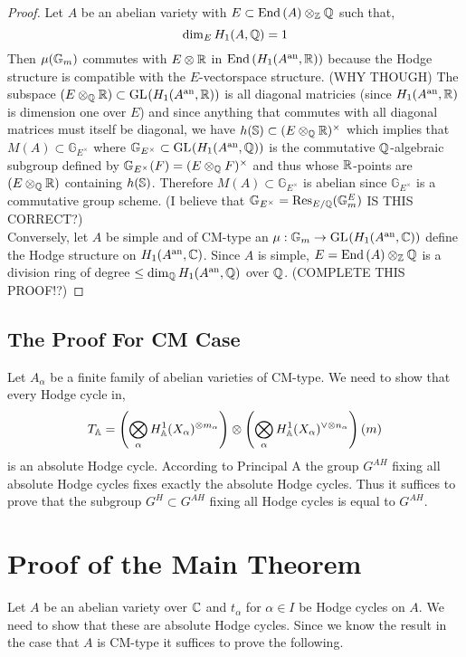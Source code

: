 \documentclass[12pt]{article}
\begin{document}
\begin{proof}
Let $A$ be an abelian variety with $E \subset \End{A} \otimes_\Z \Q$ such that, 
\[ \dim_{E} H_1(A, \Q) = 1 \]
Then $\mu(\Gm)$ commutes with $E \otimes \R$ in $\End{H_1(A^\an, \R)}$ because the Hodge structure is compatible with the $E$-vectorspace structure. (WHY THOUGH)
The subspace $(E \otimes_\Q \R) \subset \GL{}{H_1(A^\an, \R)}$ is all diagonal matricies (since $H_1(A^\an, \R)$ is dimension one over $E$) and since anything that commutes with all diagonal matrices must itself be diagonal, we have $h(\S) \subset (E \otimes_\Q \R)^\times$ which implies that $M(A) \subset \mathbb{G}_{E^\times}$ where $\mathbb{G}_{E^\times} \subset \GL{}{H_1(A^\an, \Q)}$ is the commutative $\Q$-algebraic subgroup defined by $\mathbb{G}_{E^\times}(F) = (E \otimes_\Q F)^\times$ and thus whose $\R$-points are $(E \otimes_\Q \R)$ containing $h(\S)$. Therefore $M(A) \subset \mathbb{G}_{E^\times}$ is abelian since $\mathbb{G}_{E^\times}$ is a commutative group scheme. (I believe that $\mathbb{G}_{E^\times} = \Res_{E / \Q} (\Gm^E)$ IS THIS CORRECT?)
\bigskip\\
Conversely, let $A$ be simple and of CM-type an $\mu : \Gm \to \GL{}{H_1(A^\an, \C)}$ define the Hodge structure on $H_1(A^\an, \C)$. Since $A$ is simple, $E = \End{A} \otimes_\Z \Q$ is a division ring of degree $\le \dim_{\Q}{H_1(A^\an, \Q)}$ over $\Q$. 
(COMPLETE THIS PROOF!?)
\end{proof}


\subsection{The Proof For CM Case}

Let $A_\alpha$ be a finite family of abelian varieties of CM-type. We need to show that every Hodge cycle in,
\[ T_{\A} = \left( \bigotimes_\alpha H^1_\A(X_\alpha)^{\otimes m_\alpha} \right) \otimes \left( \bigotimes_\alpha H^1_{\A}(X_\alpha)^{\vee \otimes n_\alpha} \right)(m) \]
is an absolute Hodge cycle. According to Principal A the group $G^{AH}$ fixing all absolute Hodge cycles fixes exactly the absolute Hodge cycles. Thus it suffices to prove that the subgroup $G^H \subset G^{AH}$ fixing all Hodge cycles is equal to $G^{AH}$. 


\section{Proof of the Main Theorem}

Let $A$ be an abelian variety over $\C$ and $t_\alpha$ for $\alpha \in I$ be Hodge cycles on $A$. We need to show that these are absolute Hodge cycles. Since we know the result in the case that $A$ is CM-type it suffices to prove the following.
\end{document}
